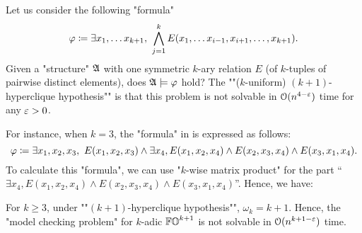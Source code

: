 \begin{hypothesis}\label{hypothesis: hyperclique hypothesis rephrased}
Let us consider the following "formula"
\[\fml \defeq \exists x_1, \dots x_{k+1},\ \bigwedge_{j = 1}^{k} E(x_1, \dots x_{i-1}, x_{i+1}, \dots, x_{k+1}).\]
Given a "structure" $\struc$ with one symmetric $k$-ary relation $E$ (of $k$-tuples of pairwise distinct elements),
does $\struc \models \fml$ hold?
The ""($k$-uniform) $(k+1)$-hyperclique hypothesis"" is that this problem is not solvable in $\mathcal{O}(n^{4 - \varepsilon})$ time for any $\varepsilon > 0$.\lipicsEnd
\end{hypothesis}
For instance, when $k = 3$, the "formula" in  is expressed as follows:
\[\fml \defeq \exists x_1, x_2, x_3,\  E(x_1, x_2, x_3) \land \exists x_4, E(x_1, x_2, x_4) \land E(x_2, x_3, x_4) \land E(x_3, x_1, x_4).\]
To calculate this "formula", we can use "$k$-wise matrix product" for the part ``$\exists x_4, E(x_1, x_2, x_4) \land E(x_2, x_3, x_4) \land E(x_3, x_1, x_4)$''.
Hence, we have:
\begin{proposition}
  For $k \ge 3$, under ""$(k+1)$-hyperclique hypothesis"", $\omega_k = k+1$.
  Hence, the "model checking problem" for $k$-adic $\mathbb{FO}^{k+1}$ is not solvable in $\mathcal{O}(n^{k + 1 - \varepsilon})$ time.
\end{proposition}

